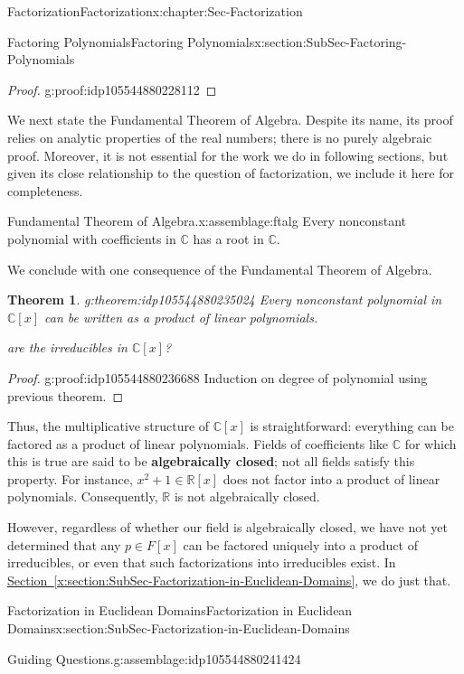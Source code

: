 \documentclass[oneside,10pt,]{book}
\newcommand{\xreffont}{\relax}
\newcommand{\terminology}[1]{\textbf{#1}}
\numberwithin{equation}{section}
\def\C{{\mathbb C}}
\def\R{{\mathbb R}}
\newtheorem{theorem}{Theorem}[section]
\begin{document}
\begin{chapterptx}{Factorization}{}{Factorization}{}{}{x:chapter:Sec-Factorization}
\begin{sectionptx}{Factoring Polynomials}{}{Factoring Polynomials}{}{}{x:section:SubSec-Factoring-Polynomials}
\begin{proof}{}{g:proof:idp105544880228112}
\end{proof}
We next state the Fundamental Theorem of Algebra. Despite its name, its proof relies on analytic properties of the real numbers; there is no purely algebraic proof. Moreover, it is not essential for the work we do in following sections, but given its close relationship to the question of factorization, we include it here for completeness.%
\begin{assemblage}{Fundamental Theorem of Algebra.}{x:assemblage:ftalg}%
Every nonconstant polynomial with coefficients in \(\C\) has a root in \(\C\).%
\end{assemblage}
We conclude with one consequence of the Fundamental Theorem of Algebra.%
\begin{theorem}{}{}{g:theorem:idp105544880235024}%
Every nonconstant polynomial in \(\C[x]\) can be written as a product of linear polynomials.%
\par\smallskip%
\noindentWhat are the irreducibles in \(\C[x]\)?%
\end{theorem}
\begin{proof}{}{g:proof:idp105544880236688}
Induction on degree of polynomial using previous theorem.%
\end{proof}
Thus, the multiplicative structure of \(\C[x]\) is straightforward: everything can be factored as a product of linear polynomials. Fields of coefficients like \(\C\) for which this is true are said to be \terminology{algebraically closed}; not all fields satisfy this property. For instance, \(x^2 + 1\in \R[x]\) does not factor into a product of linear polynomials. Consequently, \(\R\) is not algebraically closed.%
\par
However, regardless of whether our field is algebraically closed, we have not yet determined that any \(p\in F[x]\) can be factored uniquely into a product of irreducibles, or even that such factorizations into irreducibles exist. In \hyperref[x:section:SubSec-Factorization-in-Euclidean-Domains]{Section~{\xreffont\ref{x:section:SubSec-Factorization-in-Euclidean-Domains}}}, we do just that.%
\end{sectionptx}
%
%
\typeout{************************************************}
\typeout{************************************************}
%
\begin{sectionptx}{Factorization in Euclidean Domains}{}{Factorization in Euclidean Domains}{}{}{x:section:SubSec-Factorization-in-Euclidean-Domains}
\begin{assemblage}{Guiding Questions.}{g:assemblage:idp105544880241424}%

\end{assemblage}
\end{sectionptx}
\end{chapterptx}
\end{document}
